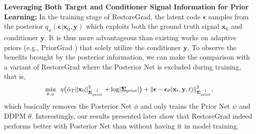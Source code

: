 \noindent\textbf{Leveraging Both Target and Conditioner Signal Information for Prior Learning:} 
In the training stage of RestoreGrad, the latent code $\boldsymbol{\epsilon}$ samples from the posterior $q_\phi(\boldsymbol{\epsilon}|\mathbf{x}_0,\mathbf{y})$ which exploits both the ground truth signal $\mathbf{x}_0$ and conditioner $\mathbf{y}$. It is thus more advantageous than existing works on adaptive priors (e.g., PriorGrad \citep{lee2021priorgrad}) that solely utilize the conditioner $\mathbf{y}$. To observe the benefits brought by the posterior information, we can make the comparison with a variant of RestoreGrad where the Posterior Net is excluded during training, that is,
\begin{equation}
\begin{small}
    \min_{\theta,\psi} \,\,\, \eta\bigr(\bar{\alpha}_T\norm{\mathbf{x}_0}^2_{\boldsymbol{\Sigma}^{-1}_{\text{prior}}}+\log\abs{\boldsymbol{\Sigma}_{\text{prior}}}\bigr)+\norm{\boldsymbol{\epsilon}-\boldsymbol{\epsilon}_\theta(\mathbf{x}_t,\mathbf{y},t)}^2_{\boldsymbol{\Sigma}^{-1}_{\text{prior}}},
\label{eq: elbo of restoregrad no post net}
\end{small}
\end{equation}
which basically removes the Posterior Net $\phi$ and only trains the Prior Net $\psi$ and DDPM $\theta$. Interestingly, our results presented later show that RestoreGrad indeed performs better with Posterior Net than without having it in model training.

